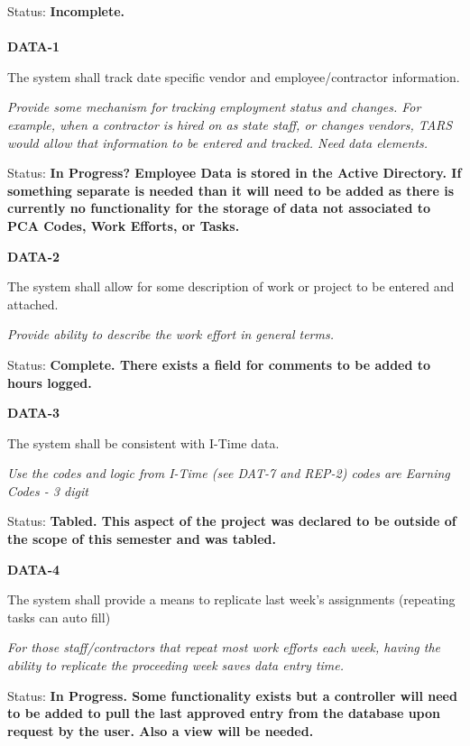  Status: \textbf{Incomplete.}\\
\\
\noindent \textbf{DATA-1}

\noindent The system shall track date specific vendor and employee/contractor information.

\noindent \textit{Provide some mechanism for tracking employment status and changes. For example, when a contractor is hired on as state staff, or changes vendors, TARS would allow that information to be entered and tracked. Need data elements.}

\noindent Status: \textbf{In Progress?  Employee Data is stored in the Active Directory.  If something separate is needed than it will need to be added as there is currently no functionality for the storage of data not associated to PCA Codes, Work Efforts, or Tasks.}\textit{}

\noindent \textit{}

\noindent \textbf{DATA-2}

\noindent The system shall allow for some description of work or project to be entered and attached.

\textit{Provide ability to describe the work effort in general terms.}

Status: \textbf{Complete.  There exists a field for comments to be added to hours logged.}\textit{}\\

\noindent 

\noindent \textbf{DATA-3}

\noindent The system shall be consistent with I-Time data.

\noindent \textit{Use the codes and logic from I-Time (see DAT-7 and REP-2) codes are Earning Codes - 3 digit}

\noindent Status: \textbf{Tabled.  This aspect of the project was declared to be outside of the scope of this semester and was tabled.}\textit{}\\

\noindent 

\noindent \textbf{DATA-4}

\noindent The system shall provide a means to replicate last week's assignments (repeating tasks can auto fill)

\noindent \textit{For those staff/contractors that repeat most work efforts each week, having the ability to replicate the proceeding week saves data entry time.}

\noindent Status: \textbf{In Progress.  Some functionality exists but a controller will need to be added to pull the last approved entry from the database upon request by the user.  Also a view will be needed.}\textit{}\\


